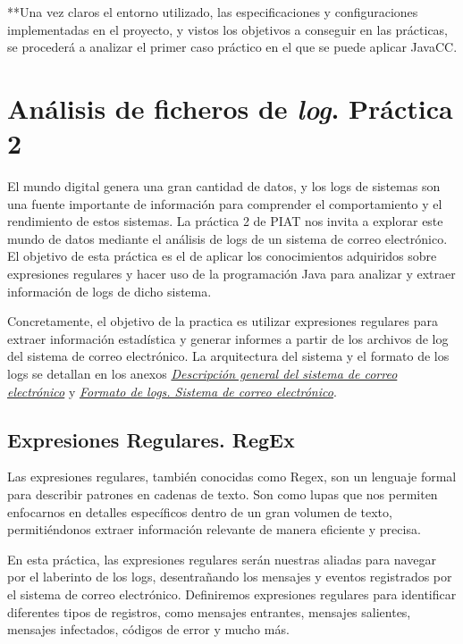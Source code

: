 **Una vez claros el entorno utilizado, las especificaciones y configuraciones implementadas en el proyecto, y vistos los objetivos a conseguir en las prácticas, se procederá a analizar el primer caso práctico en el que se puede aplicar JavaCC.

\section{Análisis de ficheros de \textit{log}. Práctica 2}

\noindent El mundo digital genera una gran cantidad de datos, y los logs de sistemas son una fuente importante de información para comprender el comportamiento y el rendimiento de estos sistemas. La práctica 2 de PIAT nos invita a explorar este mundo de datos mediante el análisis de logs de un sistema de correo electrónico. El objetivo de esta práctica es el de aplicar los conocimientos adquiridos sobre expresiones regulares y hacer uso de la programación Java para analizar y extraer información de logs de dicho sistema.

Concretamente, el objetivo de la practica es utilizar expresiones regulares para extraer información estadística y generar informes a partir de los archivos de log del sistema de correo electrónico. La arquitectura del sistema y el formato de los logs se detallan en los anexos \hyperref[sec:P2SistemaCorreo]{\textit{Descripción general del sistema de correo electrónico}} y \hyperref[sec:logscorreo]{\textit{Formato de logs. Sistema de correo electrónico}}.


\subsection{Expresiones Regulares. RegEx}

\noindent Las expresiones regulares, también conocidas como Regex, son un lenguaje formal para describir patrones en cadenas de texto. Son como lupas que nos permiten enfocarnos en detalles específicos dentro de un gran volumen de texto, permitiéndonos extraer información relevante de manera eficiente y precisa.

En esta práctica, las expresiones regulares serán nuestras aliadas para navegar por el laberinto de los logs, desentrañando los mensajes y eventos registrados por el sistema de correo electrónico. Definiremos expresiones regulares para identificar diferentes tipos de registros, como mensajes entrantes, mensajes salientes, mensajes infectados, códigos de error y mucho más.

